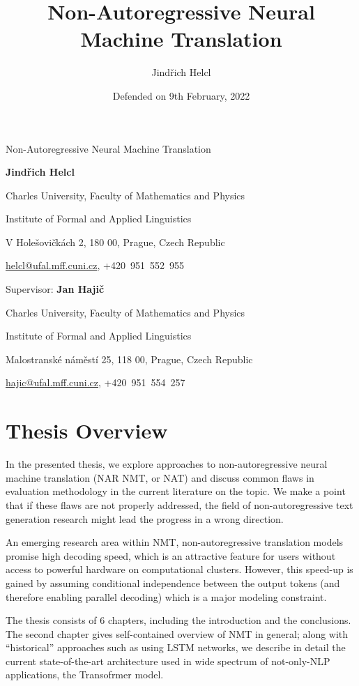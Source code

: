 \documentclass[12pt,a4paper]{article}
\author{Jindřich Helcl}
\title{Non-Autoregressive Neural Machine Translation}
\date{Defended on 9th February, 2022}
\begin{document}
{\centering
  {\LARGE Non-Autoregressive Neural Machine Translation \par}
  \vspace{0.5cm}
  {\bf Jindřich Helcl \par}
  {Charles University, Faculty of Mathematics and Physics \par}
  {Institute of Formal and Applied Linguistics \par}
  {V Holešovičkách 2, 180 00, Prague, Czech Republic \par}
  {\url{helcl@ufal.mff.cuni.cz}, +420~951~552~955}

  \vspace{0.5cm}
  {Supervisor: {\bf Jan Hajič} \par}
  {Charles University, Faculty of Mathematics and Physics \par}
  {Institute of Formal and Applied Linguistics \par}
  {Malostranské náměstí 25, 118 00, Prague, Czech Republic \par}
  {\url{hajic@ufal.mff.cuni.cz}, +420~951~554~257\par}
  \vspace{0.5cm}
}

\section*{Thesis Overview}

In the presented thesis, we explore approaches to non-autoregressive neural
machine translation (NAR NMT, or NAT) and discuss common flaws in evaluation
methodology in the current literature on the topic. We make a point that if
these flaws are not properly addressed, the field of non-autoregressive text
generation research might lead the progress in a wrong direction.

An emerging research area within NMT, non-autoregressive translation models
promise high decoding speed, which is an attractive feature for users without
access to powerful hardware on computational clusters. However, this speed-up
is gained by assuming conditional independence between the output tokens (and
therefore enabling parallel decoding) which is a major modeling constraint.

The thesis consists of 6 chapters, including the introduction and the
conclusions. The second chapter gives self-contained overview of NMT in
general; along with ``historical'' approaches such as using LSTM networks, we
describe in detail the current state-of-the-art architecture used in wide
spectrum of not-only-NLP applications, the Transofrmer model.
\end{document}
